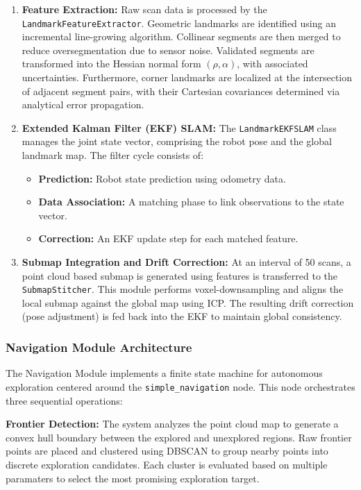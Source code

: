 \documentclass[11pt]{article}
\begin{document}
\begin{enumerate}
	\item \textbf{Feature Extraction:} Raw scan data is processed by the \texttt{LandmarkFeatureExtractor}. Geometric landmarks are identified using an incremental line-growing algorithm. Collinear segments are then merged to reduce oversegmentation due to sensor noise. Validated segments are transformed into the Hessian normal form $(\rho, \alpha)$, with associated uncertainties. Furthermore, corner landmarks are localized at the intersection of adjacent segment pairs, with their Cartesian covariances determined via analytical error propagation.
	
	\item \textbf{Extended Kalman Filter (EKF) SLAM:} The \texttt{LandmarkEKFSLAM} class manages the joint state vector, comprising the robot pose and the global landmark map. The filter cycle consists of:
	\begin{itemize}
		\item \textbf{Prediction:} Robot state prediction using odometry data.
		\item \textbf{Data Association:} A matching phase to link observations to the state vector.
		\item \textbf{Correction:} An EKF update step for each matched feature. 
	\end{itemize}
	
	\item \textbf{Submap Integration and Drift Correction:} At an interval of 50 scans, a point cloud based submap is generated using features is transferred to the \texttt{SubmapStitcher}. This module performs voxel-downsampling and aligns the local submap against the global map using ICP. The resulting drift correction (pose adjustment) is fed back into the EKF to maintain global consistency.
\end{enumerate}

\subsubsection{Navigation Module Architecture}

The Navigation Module implements a finite state machine for autonomous exploration centered around the \texttt{simple\_navigation} node. This node orchestrates three sequential operations:

\textbf{Frontier Detection:} The system analyzes the point cloud map to generate a convex hull boundary between the explored and unexplored regions. Raw frontier points are placed and clustered using DBSCAN to group nearby points into discrete exploration candidates. Each cluster is evaluated based on multiple paramaters to select the most promising exploration target.
\end{document}
